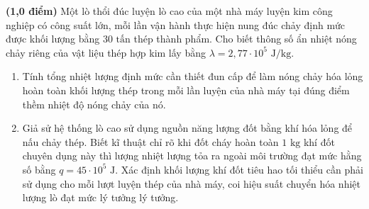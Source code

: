 \begin{ex}	\textbf{(1,0 điểm)} Một lò thổi đúc luyện lò cao của một nhà máy luyện kim công nghiệp có công suất lớn, mỗi lần vận hành thực hiện nung đúc chảy định mức được khối lượng bằng $30\text{ tấn}$ thép thành phẩm. Cho biết thông số ẩn nhiệt nóng chảy riêng của vật liệu thép hợp kim lấy bằng $\lambda = 2,77 \cdot 10^5\text{ J/kg}$.
	\begin{enumerate}
		\item[a.] Tính tổng nhiệt lượng định mức cần thiết đun cấp để làm nóng chảy hóa lỏng hoàn toàn khối lượng thép trong mỗi lần luyện của nhà máy tại đúng điểm thềm nhiệt độ nóng chảy của nó.
		\item[b.] Giả sử hệ thống lò cao sử dụng nguồn năng lượng đốt bằng khí hóa lỏng để nấu chảy thép. Biết kĩ thuật chỉ rõ khi đốt cháy hoàn toàn $1\text{ kg}$ khí đốt chuyên dụng này thì lượng nhiệt lượng tỏa ra ngoài môi trường đạt mức hằng số bằng $q = 45 \cdot 10^5\text{ J}$. Xác định khối lượng khí đốt tiêu hao tối thiểu cần phải sử dụng cho mỗi lượt luyện thép của nhà máy, coi hiệu suất chuyển hóa nhiệt lượng lò đạt mức lý tưởng lý tưởng.
	\end{enumerate}
\end{ex}

